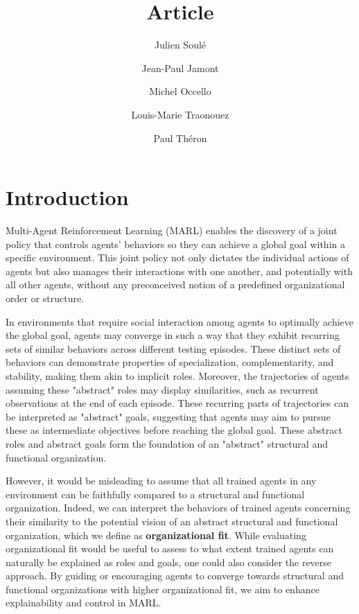 \documentclass[sigconf,anonymous]{aamas}
\title[AAMAS-2025 CybMASDE]{Article}
\author{Julien Soulé}
\affiliation{
  \institution{Univ. Grenoble Alpes}
  \city{Valence}
  \country{France}}
\author{Jean-Paul Jamont}
\affiliation{
  \institution{Univ. Grenoble Alpes}
  \city{Valence}
  \country{France}}
\author{Michel Occello}
\affiliation{
  \institution{Univ. Grenoble Alpes}
  \city{Valence}
  \country{France}}
\author{Louis-Marie Traonouez}
\affiliation{
  \institution{Thales Land and Air Systems, BU IAS}
  \city{Rennes}
  \country{France}}
\author{Paul Théron}
\affiliation{
  \institution{AICA IWG}
  \city{La Guillermie}
  \country{France}}
\begin{document}

\pagestyle{fancy}
\fancyhead{}


\maketitle


\section{Introduction}

Multi-Agent Reinforcement Learning (MARL) enables the discovery of a joint policy that controls agents' behaviors so they can achieve a global goal within a specific environment. 
This joint policy not only dictates the individual actions of agents but also manages their interactions with one another, and potentially with all other agents, without any preconceived notion of a predefined organizational order or structure. 

In environments that require social interaction among agents to optimally achieve the global goal, agents may converge in such a way that they exhibit recurring sets of similar behaviors across different testing episodes. 
These distinct sets of behaviors can demonstrate properties of specialization, complementarity, and stability, making them akin to implicit roles. Moreover, the trajectories of agents assuming these "abstract" roles may display similarities, such as recurrent observations at the end of each episode. These recurring parts of trajectories can be interpreted as "abstract" goals, suggesting that agents may aim to pursue these as intermediate objectives before reaching the global goal. These abstract roles and abstract goals form the foundation of an "abstract" structural and functional organization.

However, it would be misleading to assume that all trained agents in any environment can be faithfully compared to a structural and functional organization. Indeed, we can interpret the behaviors of trained agents concerning their similarity to the potential vision of an abstract structural and functional organization, which we define as \textbf{organizational fit}.
While evaluating organizational fit would be useful to assess to what extent trained agents can naturally be explained as roles and goals, one could also consider the reverse approach. By guiding or encouraging agents to converge towards structural and functional organizations with higher organizational fit, we aim to enhance explainability and control in MARL.
\end{document}
